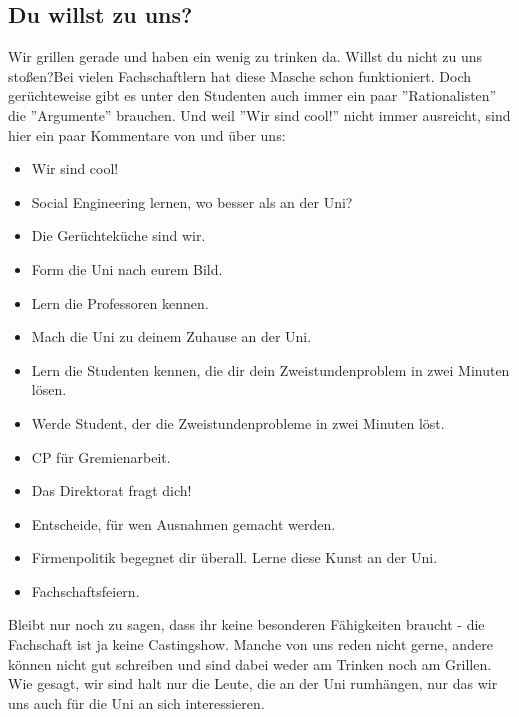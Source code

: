 \subsection{Du willst zu uns?}
    \glqq Wir grillen gerade und haben ein wenig zu trinken da. Willst du nicht zu uns stoßen?\grqq { }Bei vielen Fachschaftlern hat diese Masche schon funktioniert. Doch gerüchteweise gibt es unter den Studenten auch immer ein paar ''Rationalisten'' die ''Argumente'' brauchen. Und weil ''Wir sind cool!'' nicht immer ausreicht, sind hier ein paar Kommentare von und über uns:
    \begin{itemize}
        \item Wir sind cool!
        \item Social Engineering lernen, wo besser als an der Uni?
        \item Die Gerüchteküche sind wir.
        \item Form die Uni nach eurem Bild.
        \item Lern die Professoren kennen.
        \item Mach die Uni zu deinem Zuhause an der Uni.
        \item Lern die Studenten kennen, die dir dein Zweistundenproblem in zwei Minuten lösen.
        \item Werde Student, der die Zweistundenprobleme in zwei Minuten löst.
        \item CP für Gremienarbeit.
        \item Das Direktorat fragt dich!
        \item Entscheide, für wen Ausnahmen gemacht werden.
        \item Firmenpolitik begegnet dir überall. Lerne diese Kunst an der Uni.
        \item Fachschaftsfeiern.
    \end{itemize}
    Bleibt nur noch zu sagen, dass ihr keine besonderen F\"ahigkeiten braucht - die Fachschaft ist ja keine Castingshow.
    Manche von uns reden nicht gerne, andere k\"onnen nicht gut schreiben und sind dabei weder am Trinken noch am Grillen.
    Wie gesagt, wir sind halt nur die Leute, die an der Uni rumh\"angen, nur das wir uns auch f\"ur die Uni an sich interessieren.

